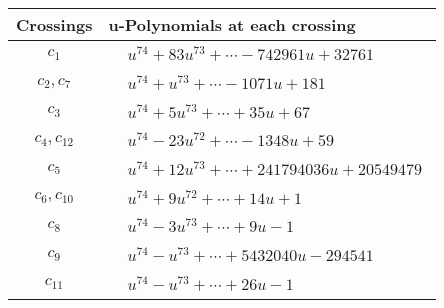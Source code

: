 \documentclass[1p]{elsarticle_modified}
\theoremstyle{definition}
\begin{document}
\begin{tabular}{m{50pt}|m{274pt}}
Crossings & \hspace{64pt}u-Polynomials at each crossing \\
\hline $$\begin{aligned}c_{1}\end{aligned}$$&$\begin{aligned}
&u^{74}+83 u^{73}+\cdots-742961 u+32761
\end{aligned}$\\
\hline $$\begin{aligned}c_{2},c_{7}\end{aligned}$$&$\begin{aligned}
&u^{74}+u^{73}+\cdots-1071 u+181
\end{aligned}$\\
\hline $$\begin{aligned}c_{3}\end{aligned}$$&$\begin{aligned}
&u^{74}+5 u^{73}+\cdots+35 u+67
\end{aligned}$\\
\hline $$\begin{aligned}c_{4},c_{12}\end{aligned}$$&$\begin{aligned}
&u^{74}-23 u^{72}+\cdots-1348 u+59
\end{aligned}$\\
\hline $$\begin{aligned}c_{5}\end{aligned}$$&$\begin{aligned}
&u^{74}+12 u^{73}+\cdots+241794036 u+20549479
\end{aligned}$\\
\hline $$\begin{aligned}c_{6},c_{10}\end{aligned}$$&$\begin{aligned}
&u^{74}+9 u^{72}+\cdots+14 u+1
\end{aligned}$\\
\hline $$\begin{aligned}c_{8}\end{aligned}$$&$\begin{aligned}
&u^{74}-3 u^{73}+\cdots+9 u-1
\end{aligned}$\\
\hline $$\begin{aligned}c_{9}\end{aligned}$$&$\begin{aligned}
&u^{74}- u^{73}+\cdots+5432040 u-294541
\end{aligned}$\\
\hline $$\begin{aligned}c_{11}\end{aligned}$$&$\begin{aligned}
&u^{74}- u^{73}+\cdots+26 u-1
\end{aligned}$\\
\hline
\end{tabular}\\~\\
\end{document}
